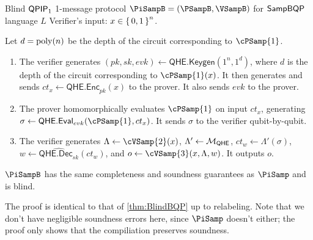 \begin{protocol}{Blind $\operatorname{\mathsf{QPIP}}_1$ 1-message protocol $\PiSampB = (\PSampB, \VSampB)$ for $\operatorname{\mathsf{SampBQP}}$ language $L$}
	\label{proto:BlindSampBQP}
	Verifier's input: $x\in\set{0,1}^n$.
	
	Let $d=\operatorname*{\operatorname{poly}}(n)$ be the depth of the circuit corresponding to $\cPSamp{1}$.
	\begin{enumerate}
		\item The verifier generates $(pk, sk, evk)\leftarrow\mathsf{QHE.Keygen}(1^n, 1^d)$, where $d$ is the depth of the circuit corresponding to $\cPSamp{1}(x)$.
			It then generates and sends $ct_x\leftarrow\mathsf{QHE.Enc}_{pk}(x)$ to the prover.
			It also sends $evk$ to the prover.
		\item The prover homomorphically evaluates $\cPSamp{1}$ on input $ct_x$, generating $\sigma\leftarrow\mathsf{QHE.Eval}_{evk}(\cPSamp{1}, ct_x)$.
			It sends $\sigma$ to the verifier qubit-by-qubit.
		\item The verifier generates $\Lambda\leftarrow\cVSamp{2}(x)$,
			$\Lambda'\leftarrow{\cal M}_{\mathsf{QHE}}$,
			$ct_w\leftarrow\Lambda'(\sigma)$,
			$w\leftarrow\widehat{\mathsf{QHE.Dec}_{sk}}(ct_w)$,
			and $o\leftarrow\cVSamp{3}(x, \Lambda, w)$.
			It outputs $o$.
	\end{enumerate}
\end{protocol}

\begin{thm}
	$\PiSampB$ has the same completeness and soundness guarantees as $\PiSamp$ and is blind.
\end{thm}
\begin{prf}
	The proof is identical to that of \cref{thm:BlindBQP} up to relabeling.
	Note that we don't have negligible soundness errors here, since $\PiSamp$ doesn't either; the proof only shows that the compiliation preserves soundness.
\end{prf}
